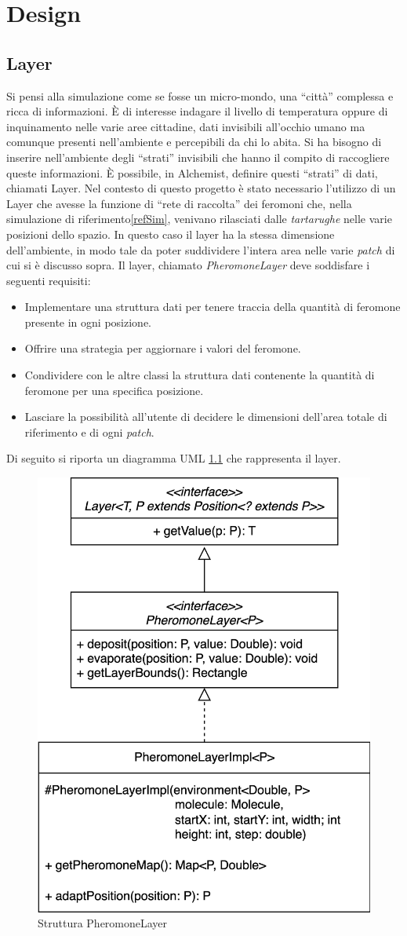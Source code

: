\chapter{Design}
\section{Layer}
Si pensi alla simulazione come se fosse un micro-mondo, una ``città'' complessa
e ricca di informazioni. È di interesse indagare il livello di temperatura oppure di inquinamento nelle varie aree cittadine, dati invisibili
all'occhio umano ma comunque presenti nell'ambiente e percepibili da chi lo abita. Si ha bisogno
di inserire nell'ambiente degli ``strati'' invisibili che hanno il compito di raccogliere queste informazioni.
È possibile, in Alchemist, definire questi ``strati'' di dati, chiamati Layer.
\newline
Nel contesto di questo progetto è stato necessario l'utilizzo di un Layer che avesse la funzione di ``rete di raccolta''
dei feromoni che, nella simulazione di riferimento\space\ref{refSim}, venivano rilasciati dalle \textit{tartarughe} nelle varie posizioni
dello spazio. In questo caso il layer ha la stessa dimensione dell'ambiente, in modo tale da poter suddividere l'intera area nelle varie \textit{patch} di cui si 
è discusso sopra.
Il layer, chiamato \textit{PheromoneLayer} deve soddisfare i seguenti requisiti:
\begin{itemize}
    \item Implementare una struttura dati per tenere traccia della quantità di feromone presente in ogni posizione.
    \item Offrire una strategia per aggiornare i valori del feromone.
    \item Condividere con le altre classi la struttura dati contenente la quantità di feromone per una specifica posizione.
    \item Lasciare la possibilità all'utente di decidere le dimensioni dell'area totale di riferimento e di ogni \textit{patch}.
\end{itemize}
Di seguito si riporta un diagramma UML \cref{fig:phLayer} che rappresenta il layer.
\begin{figure}[ht]
    \centering
    \includegraphics[width=.5\linewidth]{figures/pheromoneLayer.png}
    \caption{Struttura PheromoneLayer}\label{fig:phLayer}
\end{figure}

